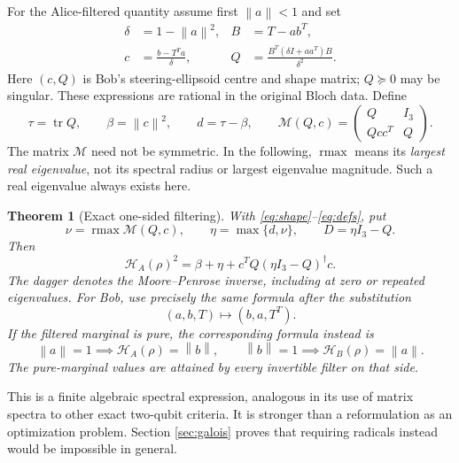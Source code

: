 \documentclass[11pt]{article}
\newtheorem{theorem}{Theorem}
\theoremstyle{remark}\newtheorem{remark}[theorem]{Remark}
\newcommand{\tr}{\operatorname{tr}}
\newcommand{\HF}{\mathcal H}
\newcommand{\norm}[1]{\left\lVert#1\right\rVert}
\DeclareMathOperator{\rmax}{rmax}
\begin{document}
For the Alice-filtered quantity assume first $\norm a<1$ and set
\begin{align}\label{eq:shape}
 \delta&=1-\norm a^2, & B&=T-ab^T,\\
 c&=\frac{b-T^Ta}{\delta}, &
 Q&=\frac{B^T(\delta I+aa^T)B}{\delta^2}.\nonumber
\end{align}
Here $(c,Q)$ is Bob's steering-ellipsoid centre and shape matrix; $Q\succeq0$
may be singular. These expressions are rational in the original Bloch data.
Define
\begin{equation}\label{eq:defs}
 \tau=\tr Q,\qquad \beta=\norm c^2,\qquad d=\tau-\beta,\qquad
 \mathscr M(Q,c)=\begin{pmatrix}Q&I_3\\ Qcc^T&Q\end{pmatrix}.
\end{equation}
The matrix $\mathscr M$ need not be symmetric. In the following,
$\rmax$ means its \emph{largest real eigenvalue}, not its spectral radius or
largest eigenvalue magnitude. Such a real eigenvalue always exists here.

\begin{theorem}[Exact one-sided filtering]\label{thm:main}
With \eqref{eq:shape}--\eqref{eq:defs}, put
\begin{equation}\label{eq:eta}
 \nu=\rmax\mathscr M(Q,c),\qquad
 \eta=\max\{d,\nu\},\qquad D=\eta I_3-Q.
\end{equation}
Then
\begin{equation}\label{eq:main}\boxed{
 \HF_A(\rho)^2=\beta+\eta+c^TQ(\eta I_3-Q)^\dagger c.}
\end{equation}
The dagger denotes the Moore--Penrose inverse, including at zero or repeated
eigenvalues. For Bob, use precisely the same formula after the substitution
\begin{equation}\label{eq:swap}(a,b,T)\longmapsto(b,a,T^T).
\end{equation}
If the filtered marginal is pure, the corresponding formula instead is
\begin{equation}\label{eq:pure}
 \norm a=1\implies\HF_A(\rho)=\norm b,
 \qquad \norm b=1\implies\HF_B(\rho)=\norm a.
\end{equation}
The pure-marginal values are attained by every invertible filter on that side.
\end{theorem}

This is a finite algebraic spectral expression, analogous in its use of
matrix spectra to other exact two-qubit criteria. It is stronger than a
reformulation as an optimization problem. Section \ref{sec:galois} proves
that requiring radicals instead would be impossible in general.
\end{document}
